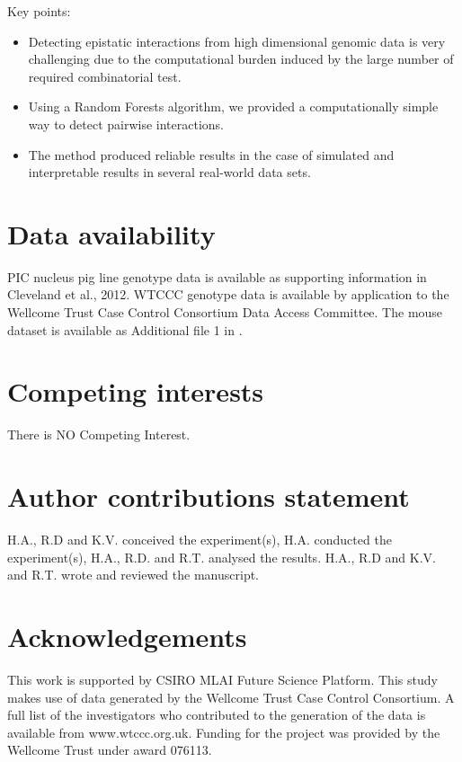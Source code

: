 \documentclass[preprint,12pt,3p]{elsarticle}
\begin{document}
Key points:
\begin{itemize}
\item Detecting epistatic interactions from high dimensional genomic data is very challenging due to the computational
  burden induced by the large number of required combinatorial test.
\item Using a Random Forests algorithm, we provided a computationally simple way to detect pairwise interactions.
\item The method produced reliable results in the case of simulated and interpretable results in several real-world
  data sets.
\end{itemize}



\appendix

\section{Data availability}
PIC nucleus pig line genotype data is available as supporting information in Cleveland et al., 2012. WTCCC genotype data
is available by application to the Wellcome Trust Case Control Consortium Data Access Committee. The mouse dataset is
available as Additional file 1 in \cite{martiniGenomicPredictionEpistasis2017}.


\FloatBarrier
\section{Competing interests}
There is NO Competing Interest.

\section{Author contributions statement}
H.A., R.D and K.V. conceived the experiment(s), H.A. conducted
the experiment(s), H.A., R.D. and R.T. analysed the results.  H.A., R.D and K.V. and R.T.  wrote and reviewed the manuscript.

\section{Acknowledgements}
This work is supported by CSIRO MLAI Future
Science Platform. This study makes use of data generated by the Wellcome Trust Case Control Consortium. A full list of
the investigators who contributed to the generation of the data is available from www.wtccc.org.uk. Funding for the
project was provided by the Wellcome Trust under award 076113.




%
%




\end{document}
